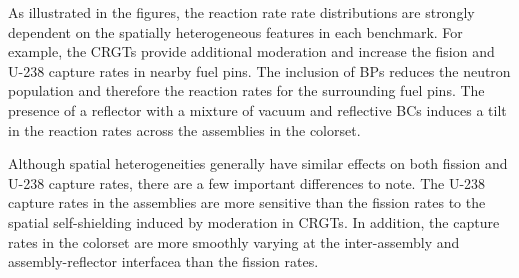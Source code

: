 As illustrated in the figures, the reaction rate rate distributions are strongly dependent on the spatially heterogeneous features in each benchmark. For example, the CRGTs provide additional moderation and increase the fision and U-238 capture rates in nearby fuel pins. The inclusion of BPs reduces the neutron population and therefore the reaction rates for the surrounding fuel pins. The presence of a reflector with a mixture of vacuum and reflective BCs induces a tilt in the reaction rates across the assemblies in the colorset.

Although spatial heterogeneities generally have similar effects on both fission and U-238 capture rates, there are a few important differences to note. The U-238 capture rates in the assemblies are more sensitive than the fission rates to the spatial self-shielding induced by moderation in CRGTs. In addition, the capture rates in the colorset are more smoothly varying at the inter-assembly and assembly-reflector interfacea than the fission rates.
